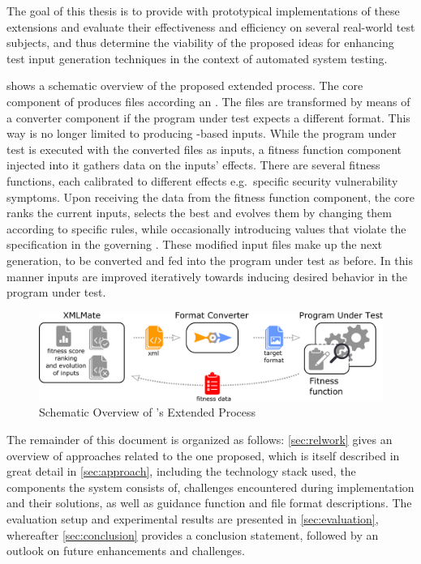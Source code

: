 The goal of this thesis is to provide \xmlmate with prototypical implementations of these extensions and
evaluate their effectiveness and efficiency on several real-world test subjects, and thus determine the
viability of the proposed ideas for enhancing test input generation techniques in the context of automated system testing.

 shows a schematic overview of the proposed extended \xmlmate process.
The core component of \xmlmate produces \xml files according an \xsd. 
The files are transformed by means of a converter component if the program under test expects a different
format. This way \xmlmate is no longer limited to producing \xml-based inputs.
While the program under test is executed with the converted files as inputs, a fitness function component
injected into it gathers data on the inputs' effects.
There are several fitness functions, each calibrated to different effects e.g.\ specific security vulnerability
symptoms. 
Upon receiving the data from the fitness function component, the \xmlmate core ranks the current inputs,
selects the best and evolves them by changing them according to specific rules, while occasionally introducing
values that violate the specification in the governing \xsd. 
These modified input files make up the next generation, to be converted and fed into the program under test as
before. 
In this manner inputs are improved iteratively towards inducing desired behavior in the program under test. 

\begin{figure}[htb]
\centering
  \includegraphics[width=\columnwidth]{overview.pdf}
  \caption{Schematic Overview of \xmlmate's Extended Process}
  \label{fig:overview}
\end{figure}

The remainder of this document is organized as follows: \cref{sec:relwork} gives an overview of approaches
related to the one proposed, which is itself described in great detail in \cref{sec:approach}, including the
technology stack used, the components the system consists of, challenges encountered during implementation and
their solutions, as well as guidance function and file format descriptions. The evaluation setup and
experimental results are presented in \cref{sec:evaluation}, whereafter \cref{sec:conclusion} provides a
conclusion statement, followed by an outlook on future enhancements and challenges.
